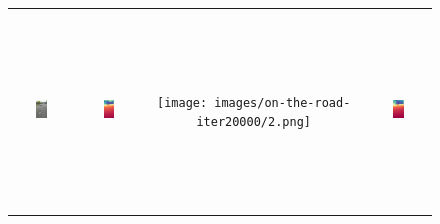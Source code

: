 \documentclass{article}
\begin{document}
\begin{figure}[H]
\begin{tabular}{cccc}
    \includegraphics[width=0.2\textwidth,height=5.2cm,keepaspectratio]{images/on-the-road/2.jpg} &
    \includegraphics[width=0.2\textwidth,height=5.2cm,keepaspectratio]{images/real_image_trained/depth_colored/2.png} &
    \texttt{[image: images/on-the-road-iter20000/2.png]} &
    \includegraphics[width=0.2\textwidth,height=5.2cm,keepaspectratio]{images/real_image/depth_colored/2.png} \\


\end{tabular}
\end{figure}
\end{document}
